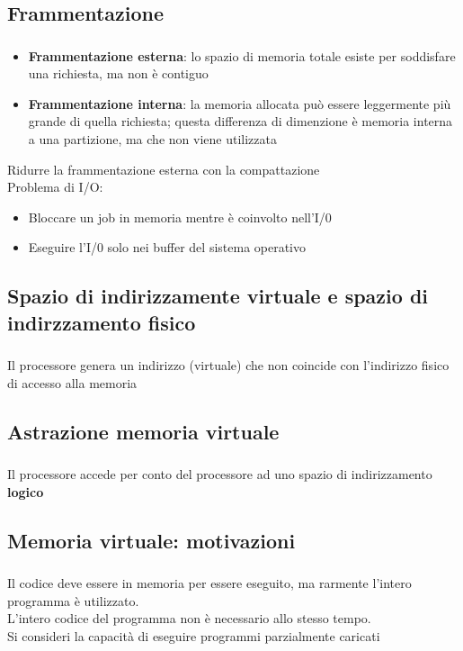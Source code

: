 \documentclass{beamer}
\newenvironment{mainframe}{
	\begin{frame}
		\frametitle{\insertsubsection}
		\framesubtitle{\insertsection}
	}{
	\end{frame}
}
\begin{document}
\subsection{Frammentazione}
\begin{mainframe}
	\begin{itemize}
		\item \textbf{Frammentazione esterna}: lo spazio di memoria totale esiste per soddisfare una richiesta, ma non è contiguo
		\item \textbf{Frammentazione interna}: la memoria allocata può essere leggermente più grande di quella richiesta; questa differenza di dimenzione è memoria interna a una partizione, ma che non viene utilizzata
	\end{itemize}
	Ridurre la frammentazione esterna con la compattazione\\
	Problema di I/O:
	\begin{itemize}
		\item Bloccare un job in memoria mentre è coinvolto nell'I/0
		\item Eseguire l'I/0 solo nei buffer del sistema operativo
	\end{itemize}
\end{mainframe}
\subsection{Spazio di indirizzamente virtuale e spazio di indirzzamento fisico}
\begin{mainframe}
	Il processore genera un indirizzo (virtuale) che non coincide con l'indirizzo fisico di accesso alla memoria
\end{mainframe}
\subsection{Astrazione memoria virtuale}
\begin{mainframe}
	Il processore accede per conto del processore ad uno spazio di indirizzamento \textbf{logico}
\end{mainframe}
\subsection{Memoria virtuale: motivazioni}
\begin{mainframe}
	Il codice deve essere in memoria per essere eseguito, ma rarmente l'intero programma è utilizzato.\\
	L'intero codice del programma non è necessario allo stesso tempo.\\
	Si consideri la capacità di eseguire programmi parzialmente caricati
\end{mainframe}
\end{document}
